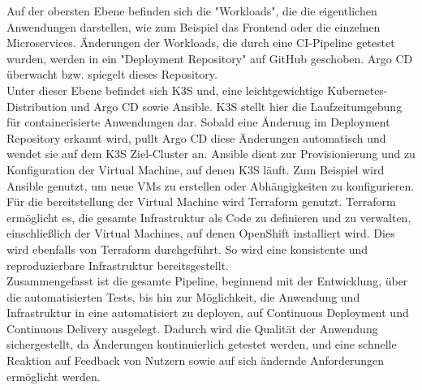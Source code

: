 Auf der obersten Ebene befinden sich die "Workloads", die die eigentlichen Anwendungen darstellen, wie zum Beispiel das Frontend oder die einzelnen Microservices. Änderungen der Workloads, die durch eine CI-Pipeline getestet wurden, werden in ein "Deployment Repository" auf GitHub geschoben. Argo CD überwacht bzw. spiegelt dieses Repository.\\ 
Unter dieser Ebene befindet sich K3S und, eine leichtgewichtige Kubernetes-Distribution und Argo CD sowie Ansible. K3S stellt hier die Laufzeitumgebung für containerisierte Anwendungen dar. Sobald eine Änderung im Deployment Repository erkannt wird, pullt Argo CD diese Änderungen automatisch und wendet sie auf dem K3S Ziel-Cluster an. Ansible dient zur Provisionierung und zu Konfiguration der Virtual Machine, auf denen K3S läuft. Zum Beispiel wird Ansible genutzt, um neue VMs zu erstellen oder Abhängigkeiten zu konfigurieren.\\
Für die bereitstellung der Virtual Machine wird Terraform genutzt. Terraform ermöglicht es, die gesamte Infrastruktur als Code zu definieren und zu verwalten, einschließlich der Virtual Machines, auf denen OpenShift installiert wird. Dies wird ebenfalls von Terraform durchgeführt. So wird eine konsistente und reproduzierbare Infrastruktur bereitsgestellt.\\

Zusammengefasst ist die gesamte Pipeline, beginnend mit der Entwicklung, über die automatisierten Tests, bis hin zur Möglichkeit, die Anwendung und Infrastruktur in eine automatisiert zu deployen, auf Continuous Deployment und Continuous Delivery ausgelegt. Dadurch wird die Qualität der Anwendung sichergestellt, da Änderungen kontinuierlich getestet werden, und eine schnelle Reaktion auf Feedback von Nutzern sowie auf sich ändernde Anforderungen ermöglicht werden.

